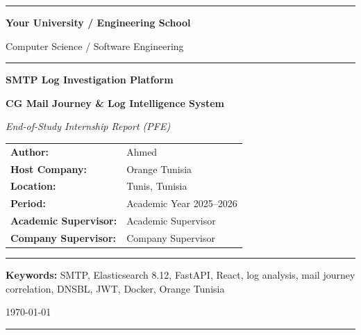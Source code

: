 \documentclass[12pt,a4paper,oneside]{report}
\newcommand{\ReportTitle}{SMTP Log Investigation Platform}
\newcommand{\ReportSubtitle}{CG Mail Journey \& Log Intelligence System}
\newcommand{\ReportType}{End-of-Study Internship Report (PFE)}
\newcommand{\AuthorName}{Ahmed}
\newcommand{\InstitutionName}{Your University / Engineering School}
\newcommand{\DepartmentName}{Computer Science / Software Engineering}
\newcommand{\SupervisorName}{Academic Supervisor}
\newcommand{\CompanyName}{Orange Tunisia}
\newcommand{\CompanySupervisorName}{Company Supervisor}
\newcommand{\InternshipPeriod}{Academic Year 2025--2026}
\newcommand{\Location}{Tunis, Tunisia}
\begin{document}
\begin{titlepage}
  \centering
  \vspace*{0.8cm}

  \textcolor{OrangeMain}{\rule{\textwidth}{3pt}}
  \vspace{0.3cm}

  {\LARGE\bfseries \InstitutionName\par}
  \vspace{0.15cm}
  {\large \DepartmentName\par}

  \vspace{0.3cm}
  \textcolor{OrangeMain}{\rule{\textwidth}{1pt}}
  \vspace{1.5cm}

  {\Huge\bfseries\color{OrangeMain} \ReportTitle\par}
  \vspace{0.4cm}
  {\Large\bfseries \ReportSubtitle\par}
  \vspace{0.25cm}
  {\large\itshape \ReportType\par}

  \vspace{1.4cm}
  \begin{tabular}{>{\bfseries}p{4.5cm} p{8cm}}
    Author:              & \AuthorName \\[4pt]
    Host Company:        & \CompanyName \\[4pt]
    Location:            & \Location \\[4pt]
    Period:              & \InternshipPeriod \\[4pt]
    Academic Supervisor: & \SupervisorName \\[4pt]
    Company Supervisor:  & \CompanySupervisorName \\
  \end{tabular}

  \vfill
  \textcolor{OrangeMain}{\rule{\textwidth}{1pt}}
  \vspace{0.3cm}
  {\normalsize\textbf{Keywords:} SMTP, Elasticsearch 8.12, FastAPI, React, log analysis, mail journey correlation, DNSBL, JWT, Docker, Orange Tunisia\par}
  \vspace{0.3cm}
  {\large \today\par}
  \textcolor{OrangeMain}{\rule{\textwidth}{3pt}}
\end{titlepage}
\end{document}
